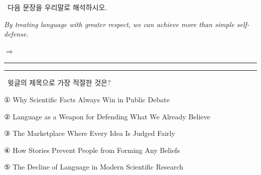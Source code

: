 \documentclass[11pt,a4paper]{article}
\newcommand{\qno}[1]{\par\vspace{8pt}\noindent{\sffamily\bfseries #1.}\ }
\newcommand{\instr}[1]{{\sffamily #1}\par\vspace{3pt}}
\begin{document}
\bigskip

\qno{3}\instr{[서술형] 다음 문장을 우리말로 해석하시오.}

\vspace{4pt}
\noindent\textit{By treating language with greater respect, we can achieve more than simple self-defense.}

\vspace{8pt}
\noindent $\Rightarrow$ \rule{\linewidth}{0.4pt}

\vspace{6pt}
\noindent \rule{\linewidth}{0.4pt}

\qno{4}\instr{윗글의 제목으로 가장 적절한 것은?}
\begin{choices}
\item ① Why Scientific Facts Always Win in Public Debate
\item ② Language as a Weapon for Defending What We Already Believe
\item ③ The Marketplace Where Every Idea Is Judged Fairly
\item ④ How Stories Prevent People from Forming Any Beliefs
\item ⑤ The Decline of Language in Modern Scientific Research
\end{choices}
\end{document}
